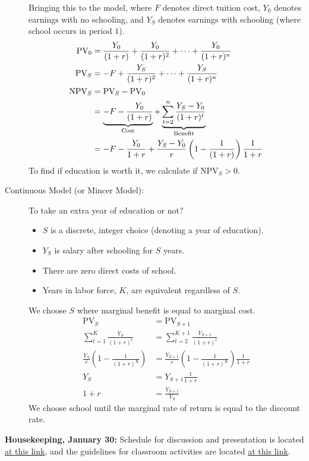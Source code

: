 \documentclass[10pt]{extarticle}
\begin{document}
\begin{description}
      Bringing this to the model, where $F$ denotes direct tuition cost, $Y_0$ denotes earnings with no schooling, and $Y_S$ denotes earnings with schooling (where school occurs in period $1$).
      \begin{align*}
        \text{PV}_{0} &= \frac{Y_0}{(1+r)} + \frac{Y_0}{(1+r)^2} + \cdots + \frac{Y_0}{(1+r)^n}\\
        \text{PV}_{S} &= -F + \frac{Y_S}{(1+r)^2} + \cdots + \frac{Y_S}{(1+r)^n}\\
        \text{NPV}_{S} &= \text{PV}_{S} - \text{PV}_{0}\\
                       &= \underbrace{-F - \frac{Y_0}{(1+r)}}_{\small\text{Cost}} + \underbrace{\sum_{t=2}^{n}\frac{Y_S - Y_0}{(1+r)^t}}_{\small\text{Benefit}}\\
                       &= -F-\frac{Y_0}{1+r} + \frac{Y_S-Y_0}{r}\left(1-\frac{1}{(1+r)}\right)\frac{1}{1+r}
      \end{align*}
      To find if education is worth it, we calculate if $\text{NPV}_{S} > 0$.
    \item[Continuous Model (or Mincer Model):] To take an extra year of education or not?
      \begin{itemize}
        \item $S$ is a discrete, integer choice (denoting a year of education).
        \item $Y_S$ is salary after schooling for $S$ years.
        \item There are zero direct costs of school.
        \item Years in labor force, $K$, are equivalent regardless of $S$.
      \end{itemize}
      We choose $S$ where marginal benefit is equal to marginal cost.
      \begin{align*}
        \text{PV}_{S} &= \text{PV}_{S+1}\\
        \sum_{t=1}^{K}\frac{Y_S}{(1+r)^t} &= \sum_{t=2}^{K+1}\frac{Y_{S+1}}{(1+r)^t}\\
        \frac{Y_S}{r}\left(1-\frac{1}{(1+r)^K}\right) &= \frac{Y_{S+1}}{r}\left(1-\frac{1}{(1+r)^K}\right)\frac{1}{1+r}\\
        Y_S &= Y_{S+1}\frac{1}{1+r}\\
        1+r &= \frac{Y_{S+1}}{Y_S}
      \end{align*}
      We choose school until the marginal rate of return is equal to the discount rate.
  \end{description}
  \textbf{Housekeeping, January 30:} Schedule for discussion and presentation is located \href{https://docs.google.com/document/d/1uy96HLNuZVGlrT8oiC49i3M6p2E57fopxGwizHv4_Hs/edit}{at this link}, and the guidelines for classroom activities are located \href{https://docs.google.com/document/d/1tnPmI21LJLdKblCUbuFMuDGobuAz2IOaineH_I4BTFg/edit}{at this link}.
\end{document}
